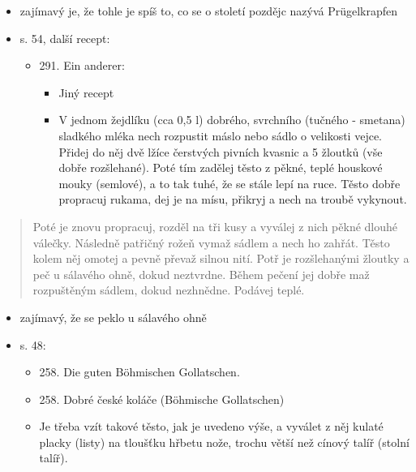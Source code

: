 \begin{itemize}
\tightlist
\item
  zajímavý je, že tohle je spíš to, co se o století pozdějc nazývá
  Prügelkrapfen
\end{itemize}

\begin{itemize}
\tightlist
\item
  s. 54, další recept:

  \begin{itemize}
  \tightlist
  \item
    291. Ein anderer:

    \begin{itemize}
    \tightlist
    \item
      Jiný recept
    \item
      V jednom žejdlíku (cca 0,5 l) dobrého, svrchního (tučného -
      smetana) sladkého mléka nech rozpustit máslo nebo sádlo o
      velikosti vejce. Přidej do něj dvě lžíce čerstvých pivních kvasnic
      a 5 žloutků (vše dobře rozšlehané). Poté tím zadělej těsto z
      pěkné, teplé houskové mouky (semlové), a to tak tuhé, že se stále
      lepí na ruce. Těsto dobře propracuj rukama, dej je na mísu,
      přikryj a nech na troubě vykynout.
    \end{itemize}
  \end{itemize}
\end{itemize}

\begin{quote}
Poté je znovu propracuj, rozděl na tři kusy a vyválej z nich pěkné
dlouhé válečky. Následně patřičný rožeň vymaž sádlem a nech ho zahřát.
Těsto kolem něj omotej a pevně převaž silnou nití. Potř je rozšlehanými
žloutky a peč u sálavého ohně, dokud neztvrdne. Během pečení jej dobře
maž rozpuštěným sádlem, dokud nezhnědne. Podávej teplé.
\end{quote}

\begin{itemize}
\tightlist
\item
  zajímavý, že se peklo u sálavého ohně
\end{itemize}

\begin{itemize}
\tightlist
\item
  s. 48:

  \begin{itemize}
  \tightlist
  \item
    258. Die guten Böhmischen Gollatschen.
  \item
    258. Dobré české koláče (Böhmische Gollatschen)
  \item
    Je třeba vzít takové těsto, jak je uvedeno výše, a vyválet z něj
    kulaté placky (listy) na tloušťku hřbetu nože, trochu větší než
    cínový talíř (stolní talíř).
  \end{itemize}
\end{itemize}

